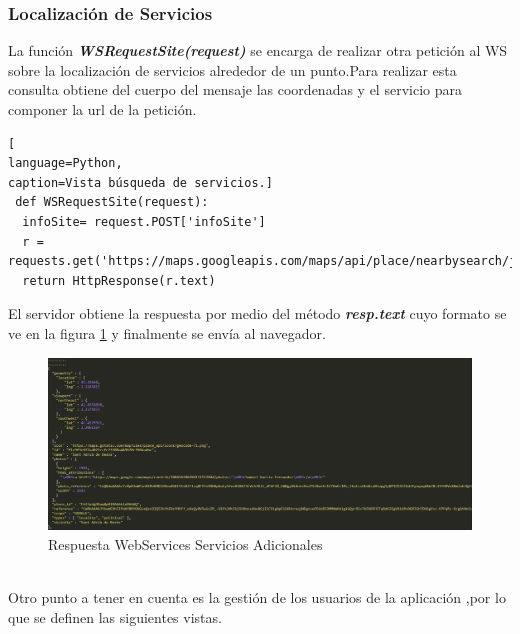 \subsubsection*{Localización de Servicios} 
La función \textit{\textbf{WSRequestSite(request)}} se encarga de realizar otra petición al WS sobre la localización de servicios alrededor de un punto.Para realizar esta consulta obtiene del cuerpo del mensaje las coordenadas y el servicio para componer la url de la petición.
\begin{lstlisting}[
language=Python,
caption=Vista búsqueda de servicios.]
 def WSRequestSite(request):
  infoSite= request.POST['infoSite']
  r = requests.get('https://maps.googleapis.com/maps/api/place/nearbysearch/json?'+infoSite+'&key=AIzaSyBliq3S6sQ0pJsT1xWJDiMtPuM1sn9xzaM')
  return HttpResponse(r.text)
\end{lstlisting}
El servidor obtiene la respuesta por medio del método \textit{\textbf{resp.text}} cuyo formato se ve en la figura \ref{fig:ResponseWS_MoreSite} y finalmente se envía al navegador.
\begin{figure}[!h]
\begin{center}
   \includegraphics[width=0.8\linewidth]{Figures/swResponse_ServicesSite}
	\decoRule
	\caption[Respuesta WebServices Servicios]{Respuesta WebServices Servicios Adicionales}
\label{fig:ResponseWS_MoreSite}
\end{center}
\end{figure}
\\Otro punto a tener en cuenta es la gestión de los usuarios de la aplicación ,por lo que se definen las siguientes vistas.
